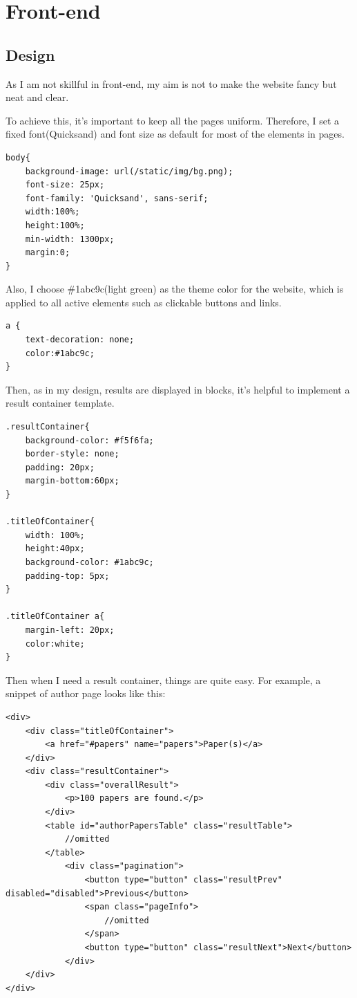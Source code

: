 \documentclass[a4paper]{article}
\begin{document}
    \section{Front-end}
        \subsection{Design}
As I am not skillful in front-end, my aim is not to make the website fancy but neat and clear. 

To achieve this, it's important to keep all the pages uniform. Therefore, I set a fixed 
font(Quicksand) and font size as default for most of the elements in pages.
\begin{verbatim}
body{
    background-image: url(/static/img/bg.png);
    font-size: 25px;
    font-family: 'Quicksand', sans-serif;
    width:100%;
    height:100%;
    min-width: 1300px;
    margin:0;
}
\end{verbatim} 
Also, I choose \#1abc9c(light green) as the theme color for the website, which is applied to all active elements
such as clickable buttons and links. 
\begin{verbatim}
a {
    text-decoration: none;
    color:#1abc9c;
}
\end{verbatim}
Then, as in my design, results are displayed in blocks, it's helpful to implement a result container template.
\begin{verbatim}
.resultContainer{
    background-color: #f5f6fa;
    border-style: none;
    padding: 20px;
    margin-bottom:60px;
}

.titleOfContainer{
    width: 100%;
    height:40px;
    background-color: #1abc9c;
    padding-top: 5px;
}

.titleOfContainer a{
    margin-left: 20px;
    color:white;  
}  
\end{verbatim}
Then when I need a result container, things are quite easy. For example, a snippet of author page looks like this:
\begin{verbatim}
<div>
    <div class="titleOfContainer">
        <a href="#papers" name="papers">Paper(s)</a>
    </div>
    <div class="resultContainer">
        <div class="overallResult">
            <p>100 papers are found.</p>
        </div>              
        <table id="authorPapersTable" class="resultTable">
            //omitted 
        </table>
            <div class="pagination">
                <button type="button" class="resultPrev" disabled="disabled">Previous</button>
                <span class="pageInfo">
                    //omitted
                </span>
                <button type="button" class="resultNext">Next</button>
            </div>
    </div>
</div>
\end{verbatim}
\end{document}
